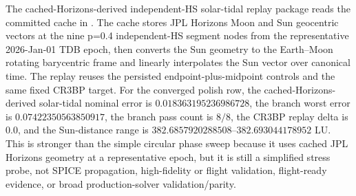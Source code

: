 \documentclass[11pt]{article}
\begin{document}
\begin{table}[htbp]
\centering
\caption{Independent-HS simple bicircular phase-sweep stress replay from persisted endpoint-plus-midpoint sidecars. The converged polish row passes all tested phases and branch-phase checks under the configured thresholds, but the model is a simple circular solar-tidal stress probe only.}
\label{tab:supp_independent_hs_bicircular_phase_stress}
\resizebox{0.9\textwidth}{!}{}
\end{table}

The cached-Horizons-derived independent-HS solar-tidal replay package reads the committed cache in . The cache stores JPL Horizons Moon and Sun geocentric vectors at the nine p=0.4 independent-HS segment nodes from the representative 2026-Jan-01 TDB epoch, then converts the Sun geometry to the Earth--Moon rotating barycentric frame and linearly interpolates the Sun vector over canonical time. The replay reuses the persisted endpoint-plus-midpoint controls and the same fixed CR3BP target. For the converged polish row, the cached-Horizons-derived solar-tidal nominal error is $0.018363195236986728$, the branch worst error is $0.07422350563850917$, the branch pass count is $8/8$, the CR3BP replay delta is $0.0$, and the Sun-distance range is $382.6857920288508$--$382.693044178952$ LU. This is stronger than the simple circular phase sweep because it uses cached JPL Horizons geometry at a representative epoch, but it is still a simplified stress probe, not SPICE propagation, high-fidelity or flight validation, flight-ready evidence, or broad production-solver validation/parity.

\begin{table}[htbp]
\centering
\caption{Independent-HS cached-Horizons-derived solar-tidal replay from persisted endpoint-plus-midpoint sidecars at a representative 2026-Jan-01 epoch. The converged polish row passes the configured thresholds, but the model remains a simplified stress probe rather than SPICE/high-fidelity validation or broad production-solver validation/parity.}
\label{tab:supp_independent_hs_horizons_solar_tidal_replay}
\resizebox{\textwidth}{!}{}
\end{table}
\end{document}

